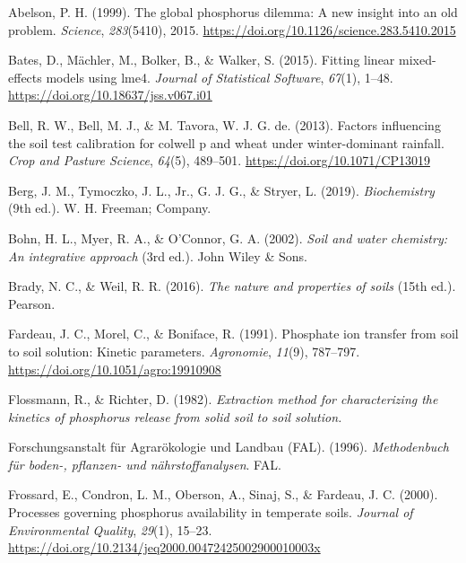 \documentclass[
  a4paper,
]{article}
\newlength{\cslhangindent}
\newenvironment{CSLReferences}[2] %
 {\begin{list}{}{%
  \setlength{\itemindent}{0pt}
  \setlength{\leftmargin}{0pt}
  \setlength{\parsep}{0pt}
  \ifodd #1
   \setlength{\leftmargin}{\cslhangindent}
   \setlength{\itemindent}{-1\cslhangindent}
  \fi
  \setlength{\itemsep}{#2\baselineskip}}}
 {\end{list}}
\begin{document}
\label{refs}
\begin{CSLReferences}{1}{0}
Abelson, P. H. (1999). The global phosphorus dilemma: A new insight into
an old problem. \emph{Science}, \emph{283}(5410), 2015.
\url{https://doi.org/10.1126/science.283.5410.2015}

Bates, D., Mächler, M., Bolker, B., \& Walker, S. (2015). Fitting linear
mixed-effects models using {lme4}. \emph{Journal of Statistical
Software}, \emph{67}(1), 1--48.
\url{https://doi.org/10.18637/jss.v067.i01}

Bell, R. W., Bell, M. J., \& M. Tavora, W. J. G. de. (2013). Factors
influencing the soil test calibration for colwell p and wheat under
winter-dominant rainfall. \emph{Crop and Pasture Science}, \emph{64}(5),
489--501. \url{https://doi.org/10.1071/CP13019}

Berg, J. M., Tymoczko, J. L., Jr., G. J. G., \& Stryer, L. (2019).
\emph{Biochemistry} (9th ed.). W. H. Freeman; Company.

Bohn, H. L., Myer, R. A., \& O'Connor, G. A. (2002). \emph{Soil and
water chemistry: An integrative approach} (3rd ed.). John Wiley \& Sons.

Brady, N. C., \& Weil, R. R. (2016). \emph{The nature and properties of
soils} (15th ed.). Pearson.

Fardeau, J. C., Morel, C., \& Boniface, R. (1991). Phosphate ion
transfer from soil to soil solution: Kinetic parameters.
\emph{Agronomie}, \emph{11}(9), 787--797.
\url{https://doi.org/10.1051/agro:19910908}

Flossmann, R., \& Richter, D. (1982). \emph{Extraction method for
characterizing the kinetics of phosphorus release from solid soil to
soil solution.}

Forschungsanstalt für Agrarökologie und Landbau (FAL). (1996).
\emph{Methodenbuch für boden-, pflanzen- und nährstoffanalysen}. FAL.

Frossard, E., Condron, L. M., Oberson, A., Sinaj, S., \& Fardeau, J. C.
(2000). Processes governing phosphorus availability in temperate soils.
\emph{Journal of Environmental Quality}, \emph{29}(1), 15--23.
\url{https://doi.org/10.2134/jeq2000.00472425002900010003x}


\end{CSLReferences}
\end{document}
